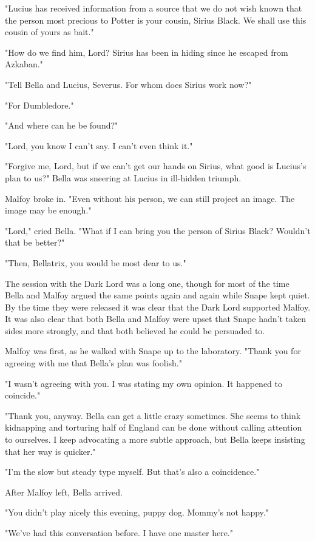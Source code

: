 "Lucius has received information from a source that we do not wish known that the person most precious to Potter is your cousin, Sirius Black. We shall use this cousin of yours as bait."

"How do we find him, Lord? Sirius has been in hiding since he escaped from Azkaban."

"Tell Bella and Lucius, Severus. For whom does Sirius work now?"

"For Dumbledore."

"And where can he be found?"

"Lord, you know I can't say. I can't even think it."

"Forgive me, Lord, but if we can't get our hands on Sirius, what good is Lucius's plan to us?" Bella was sneering at Lucius in ill-hidden triumph.

Malfoy broke in. "Even without his person, we can still project an image. The image may be enough."

"Lord," cried Bella. "What if I can bring you the person of Sirius Black? Wouldn't that be better?"

"Then, Bellatrix, you would be most dear to us."

The session with the Dark Lord was a long one, though for most of the time Bella and Malfoy argued the same points again and again while Snape kept quiet. By the time they were released it was clear that the Dark Lord supported Malfoy. It was also clear that both Bella and Malfoy were upset that Snape hadn't taken sides more strongly, and that both believed he could be persuaded to.

Malfoy was first, as he walked with Snape up to the laboratory. "Thank you for agreeing with me that Bella's plan was foolish."

"I wasn't agreeing with you. I was stating my own opinion. It happened to coincide."

"Thank you, anyway. Bella can get a little crazy sometimes. She seems to think kidnapping and torturing half of England can be done without calling attention to ourselves. I keep advocating a more subtle approach, but Bella keeps insisting that her way is quicker."

"I'm the slow but steady type myself. But that's also a coincidence."

After Malfoy left, Bella arrived.

"You didn't play nicely this evening, puppy dog. Mommy's not happy."

"We've had this conversation before. I have one master here."

